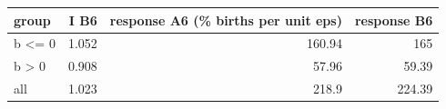 \begin{tabular}{lrrr}
\toprule
group & I B6 & response A6 (\% births per unit eps) & response B6 \\
\midrule
b <= 0 & 1.052 & 160.94 & 165 \\
b > 0 & 0.908 & 57.96 & 59.39 \\
all & 1.023 & 218.9 & 224.39 \\
\bottomrule
\end{tabular}
